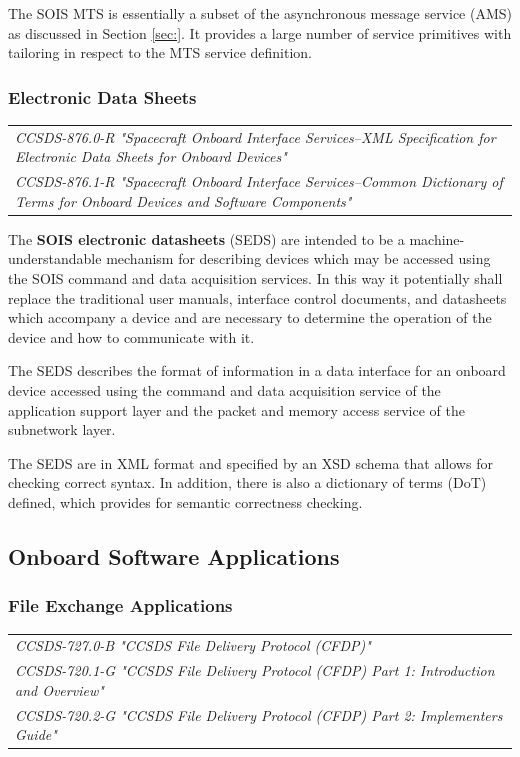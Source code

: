 The SOIS MTS is essentially a subset of the asynchronous message service (AMS) as discussed in Section \ref{sec:}. It provides a large number of service primitives with tailoring in respect to the MTS service definition.

\subsubsection{Electronic Data Sheets}

\begin{tabular}{l}
\textit{CCSDS-876.0-R "Spacecraft Onboard Interface Services--XML Specification for Electronic Data Sheets for Onboard Devices" \cite{}} \\
\textit{CCSDS-876.1-R "Spacecraft Onboard Interface Services--Common Dictionary of Terms for Onboard Devices and Software Components" \cite{}}
\end{tabular}

The \textbf{SOIS electronic datasheets} (SEDS) are intended to be a machine-understandable mechanism for describing devices which may be accessed using the SOIS command and data acquisition services. In this way it potentially shall replace the traditional user manuals, interface control documents, and datasheets which accompany a device and are necessary to determine the operation of the device and how to communicate with it.

The SEDS describes the format of information in a data interface for an onboard device accessed using the command and data acquisition service of the application support layer and the packet and memory access service of the subnetwork layer.

The SEDS are in XML format and specified by an XSD schema that allows for checking correct syntax. In addition, there is also a dictionary of terms (DoT) defined, which provides for semantic correctness checking. 

\subsection{Onboard Software Applications}
\label{sec:Onboard Software Applications}

\subsubsection{File Exchange Applications}

\begin{tabular}{l}
\textit{CCSDS-727.0-B "CCSDS File Delivery Protocol (CFDP)" \cite{CCSDS-727.0-B}} \\
\textit{CCSDS-720.1-G "CCSDS File Delivery Protocol (CFDP) Part 1: Introduction and Overview" \cite{CCSDS-720.1-G}} \\
\textit{CCSDS-720.2-G "CCSDS File Delivery Protocol (CFDP) Part 2: Implementers Guide" \cite{CCSDS-720.2-G}} \\
\end{tabular}

